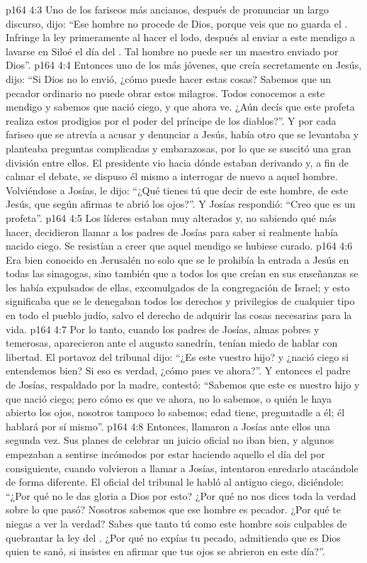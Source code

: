 \vs p164 4:3 Uno de los fariseos más ancianos, después de pronunciar un largo discurso, dijo: “Ese hombre no procede de Dios, porque veis que no guarda el . Infringe la ley primeramente al hacer el lodo, después al enviar a este mendigo a lavarse en Siloé el día del . Tal hombre no puede ser un maestro enviado por Dios”.
\vs p164 4:4 Entonces uno de los más jóvenes, que creía secretamente en Jesús, dijo: “Si Dios no lo envió, ¿cómo puede hacer estas cosas? Sabemos que un pecador ordinario no puede obrar estos milagros. Todos conocemos a este mendigo y sabemos que nació ciego, y que ahora ve. ¿Aún decís que este profeta realiza estos prodigios por el poder del príncipe de los diablos?”. Y por cada fariseo que se atrevía a acusar y denunciar a Jesús, había otro que se levantaba y planteaba preguntas complicadas y embarazosas, por lo que se suscitó una gran división entre ellos. El presidente vio hacia dónde estaban derivando y, a fin de calmar el debate, se dispuso él mismo a interrogar de nuevo a aquel hombre. Volviéndose a Josías, le dijo: “¿Qué tienes tú que decir de este hombre, de este Jesús, que según afirmas te abrió los ojos?”. Y Josías respondió: “Creo que es un profeta”.
\vs p164 4:5 Los líderes estaban muy alterados y, no sabiendo qué más hacer, decidieron llamar a los padres de Josías para saber si realmente había nacido ciego. Se resistían a creer que aquel mendigo se hubiese curado.
\vs p164 4:6 Era bien conocido en Jerusalén no solo que se le prohibía la entrada a Jesús en todas las sinagogas, sino también que a todos los que creían en sus enseñanzas se les había expulsados de ellas, excomulgados de la congregación de Israel; y esto significaba que se le denegaban todos los derechos y privilegios de cualquier tipo en todo el pueblo judío, salvo el derecho de adquirir las cosas necesarias para la vida.
\vs p164 4:7 Por lo tanto, cuando los padres de Josías, almas pobres y temerosas, aparecieron ante el augusto sanedrín, tenían miedo de hablar con libertad. El portavoz del tribunal dijo: “¿Es este vuestro hijo? y ¿nació ciego si entendemos bien? Si eso es verdad, ¿cómo pues ve ahora?”. Y entonces el padre de Josías, respaldado por la madre, contestó: “Sabemos que este es nuestro hijo y que nació ciego; pero cómo es que ve ahora, no lo sabemos, o quién le haya abierto los ojos, nosotros tampoco lo sabemos; edad tiene, preguntadle a él; él hablará por sí mismo”.
\vs p164 4:8 Entonces, llamaron a Josías ante ellos una segunda vez. Sus planes de celebrar un juicio oficial no iban bien, y algunos empezaban a sentirse incómodos por estar haciendo aquello el día del  por consiguiente, cuando volvieron a llamar a Josías, intentaron enredarlo atacándole de forma diferente. El oficial del tribunal le habló al antiguo ciego, diciéndole: “¿Por qué no le das gloria a Dios por esto? ¿Por qué no nos dices toda la verdad sobre lo que pasó? Nosotros sabemos que ese hombre es pecador. ¿Por qué te niegas a ver la verdad? Sabes que tanto tú como este hombre sois culpables de quebrantar la ley del . ¿Por qué no expías tu pecado, admitiendo que es Dios quien te sanó, si insistes en afirmar que tus ojos se abrieron en este día?”.

